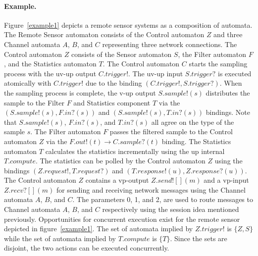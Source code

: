 \paragraph{Example.}
Figure~\ref{example1} depicts a remote sensor systems as a composition of automata.
The Remote Sensor automaton consists of the Control automaton $Z$ and three Channel automata $A$, $B$, and $C$ representing three network connections.
The Control automaton $Z$ consists of the Sensor automaton $S$, the Filter automaton $F$, and the Statistics automaton $T$.
The Control automaton $C$ starts the sampling process with the uv-up output $C.trigger!$.
The uv-up input $S.trigger?$ is executed atomically with $C.trigger!$ due to the binding $(C.trigger!, S.trigger?)$.
When the sampling process is complete, the v-up output $S.sample!(s)$ distributes the sample to the Filter $F$ and Statistics component $T$ via the $(S.sample!(s), F.in?(s))$ and $(S.sample!(s), T.in?(s))$ bindings.
Note that $S.sample!(s)$, $F.in?(s)$, and $T.in?(s)$ all agree on the type of the sample $s$.
The Filter automaton $F$ passes the filtered sample to the Control automaton $Z$ via the $F.out!(t) \to C.sample?(t)$ binding.
The Statistics automaton $T$ calculates the statistics incrementally using the up internal $T.compute$.
The statistics can be polled by the Control automaton $Z$ using the bindings $(Z.request!, T.request?)$ and $(T.response!(u), Z.response?(u))$.
The Control automaton $Z$ contains a vp-output $Z.send![](m)$ and a vp-input $Z.recv?[](m)$ for sending and receiving network messages using the Channel automata $A$, $B$, and $C$.
The parameters 0, 1, and 2, are used to route messages to Channel automata $A$, $B$, and $C$ respectively using the session idea mentioned previously.
Opportunities for concurrent execution exist for the remote sensor depicted in figure~\ref{example1}.
The set of automata implied by $Z.trigger!$ is $\{Z, S\}$ while the set of automata implied by $T.compute$ is $\{T\}$.
Since the sets are disjoint, the two actions can be executed concurrently.
